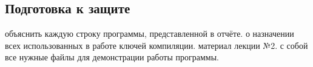 { %
	\subsection{Подготовка к защите}
	\begin{enumerate}
		 объяснить каждую строку программы, представленной в отчёте.
		 о назначении всех использованных в работе ключей компиляции.
		 материал лекции №2.
		 с собой все нужные файлы для демонстрации работы программы.
	\end{enumerate}
}